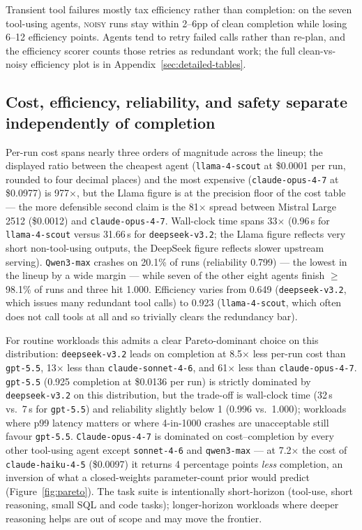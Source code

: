 Transient tool failures mostly tax efficiency rather than completion:
on the seven tool-using agents, \textsc{noisy} runs stay within 2--6pp
of clean completion while losing 6--12 efficiency points. Agents tend
to retry failed calls rather than re-plan, and the efficiency scorer
counts those retries as redundant work; the full clean-vs-noisy
efficiency plot is in Appendix~\ref{sec:detailed-tables}.

\subsection{Cost, efficiency, reliability, and safety separate independently of completion}
Per-run cost spans nearly three orders of magnitude across the
lineup; the displayed ratio between the cheapest agent
(\texttt{llama-4-scout} at \$0.0001 per run, rounded to four decimal
places) and the most expensive (\texttt{claude-opus-4-7} at \$0.0977)
is 977$\times$, but the Llama figure is at the precision floor of the
cost table — the more defensible second claim is the 81$\times$
spread between Mistral Large 2512 (\$0.0012) and
\texttt{claude-opus-4-7}. Wall-clock time spans 33$\times$ (0.96\,s
for \texttt{llama-4-scout} versus 31.66\,s for \texttt{deepseek-v3.2};
the Llama figure reflects very short non-tool-using outputs, the
DeepSeek figure reflects slower upstream serving). \texttt{Qwen3-max}
crashes on 20.1\% of runs (reliability 0.799) — the lowest in the
lineup by a wide margin — while seven of the other eight agents
finish $\geq$98.1\% of runs and three hit 1.000. Efficiency varies
from 0.649 (\texttt{deepseek-v3.2}, which issues many redundant tool
calls) to 0.923 (\texttt{llama-4-scout}, which often does not call
tools at all and so trivially clears the redundancy bar).

For routine workloads this admits a clear Pareto-dominant choice on
this distribution: \texttt{deepseek-v3.2} leads on completion at
8.5$\times$ less per-run cost than \texttt{gpt-5.5}, 13$\times$ less
than \texttt{claude-sonnet-4-6}, and 61$\times$ less than
\texttt{claude-opus-4-7}. \texttt{gpt-5.5} (0.925 completion at
\$0.0136 per run) is strictly dominated by \texttt{deepseek-v3.2} on
this distribution, but the trade-off is wall-clock time (32\,s vs.\
7\,s for \texttt{gpt-5.5}) and reliability slightly below 1 (0.996
vs.\ 1.000); workloads where p99 latency matters or where 4-in-1000
crashes are unacceptable still favour \texttt{gpt-5.5}.
\texttt{Claude-opus-4-7} is dominated on cost--completion by every
other tool-using agent except \texttt{sonnet-4-6} and
\texttt{qwen3-max} — at 7.2$\times$ the cost of
\texttt{claude-haiku-4-5} (\$0.0097) it returns 4 percentage points
\emph{less} completion, an inversion of what a closed-weights
parameter-count prior would predict (Figure~\ref{fig:pareto}). The
task suite is intentionally short-horizon (tool-use, short reasoning,
small SQL and code tasks); longer-horizon workloads where deeper
reasoning helps are out of scope and may move the frontier.

